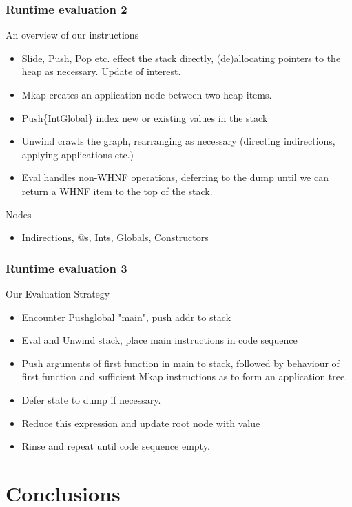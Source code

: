 \documentclass{beamer}
\begin{document}
\begin{frame}[fragile]
	\frametitle{Runtime evaluation 2}
	An overview of our instructions
	\begin{itemize}
		\item Slide, Push, Pop etc. effect
		the stack directly, (de)allocating pointers to the
		heap as necessary. Update of interest.
		\item Mkap creates an application node between two
		heap items. 
		\item Push\{Int\textbar Global\} index new or existing
		values in the stack
		\item Unwind crawls the graph, rearranging as necessary 
		(directing indirections, applying applications etc.)
		\item Eval handles non-WHNF operations, deferring to the
		dump until we can return a WHNF item to the top of the
		stack.
	\end{itemize}
	Nodes
	\begin{itemize}
		\item Indirections, @s, Ints, Globals, Constructors
	\end{itemize}
\end{frame}

\begin{frame}[fragile]
	\frametitle{Runtime evaluation 3}
	Our Evaluation Strategy
	\begin{itemize}
		\item Encounter Pushglobal "main", push addr to stack
		\item Eval and Unwind stack, place main instructions in 
		code sequence
		\item Push arguments of first function in main to stack,
		followed by behaviour of first function and sufficient 
		Mkap instructions as to form an application tree.
		\item Defer state to dump if necessary.
		\item Reduce this expression and update root node with 
		value
		\item Rinse and repeat until code sequence empty. 
	\end{itemize}
\end{frame}

\section{Conclusions}
\end{document}
